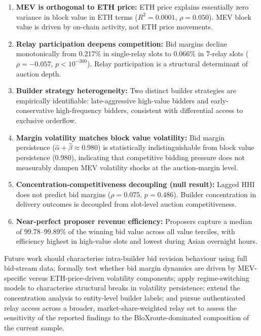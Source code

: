 \documentclass[11pt]{article}
\begin{document}
\begin{enumerate}
\item \textbf{MEV is orthogonal to ETH price:} ETH price explains essentially
zero variance in block value in ETH terms ($R^2 = 0.0001$, $\rho = 0.050$).
MEV block value is driven by on-chain activity, not ETH price movements.

\item \textbf{Relay participation deepens competition:} Bid margins decline
monotonically from 0.217\% in single-relay slots to 0.066\% in 7-relay slots
($\rho = -0.057$, $p < 10^{-300}$). Relay participation is a structural
determinant of auction depth.

\item \textbf{Builder strategy heterogeneity:} Two distinct builder strategies
are empirically identifiable: late-aggressive high-value bidders and
early-conservative high-frequency bidders, consistent with differential access
to exclusive orderflow.

\item \textbf{Margin volatility matches block value volatility:} Bid margin
persistence ($\hat\alpha + \hat\beta \approx 0.980$) is statistically
indistinguishable from block value persistence (0.980), indicating that
competitive bidding pressure does not measurably dampen MEV volatility
shocks at the auction-margin level.

\item \textbf{Concentration-competitiveness decoupling (null result):}
Lagged HHI does not predict bid margins ($\rho = 0.075$, $p = 0.486$).
Builder concentration in delivery outcomes is decoupled from slot-level
auction competitiveness.

\item \textbf{Near-perfect proposer revenue efficiency:} Proposers capture a
median of 99.78--99.89\% of the winning bid value across all value terciles,
with efficiency highest in high-value slots and lowest during Asian overnight
hours.
\end{enumerate}

Future work should characterise intra-builder bid revision behaviour using full
bid-stream data; formally test whether bid margin dynamics are driven by
MEV-specific versus ETH-price-driven volatility components; apply
regime-switching models to characterise
structural breaks in volatility persistence; extend the concentration analysis
to entity-level builder labels; and pursue authenticated relay access across a
broader, market-share-weighted relay set to assess the sensitivity of the
reported findings to the BloXroute-dominated composition of the current sample.
\end{document}
